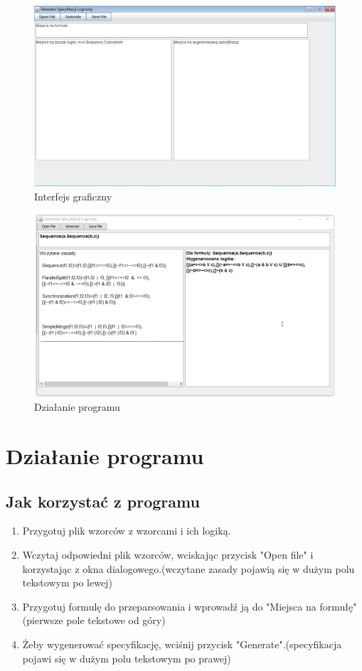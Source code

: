 \documentclass[a4paper, 11pt]{article}
\begin{document}
	\begin{figure}[H]
	\centerline{\includegraphics[scale=0.7]{GUI}}
	\caption{Interfejs graficzny}
	\end{figure}%
	
	\begin{figure}[H]
	\centerline{\includegraphics[scale=0.7]{program}}
	\caption{Działanie programu}
	\end{figure}%
	
	
	
	\section{Działanie programu}
	\subsection{Jak korzystać z programu}
	\begin{enumerate}
	\item Przygotuj plik wzorców z wzorcami i ich logiką.
	\item Wczytaj odpowiedni plik wzorców, wciskając przycisk "Open file" i korzystając z okna dialogowego.(wczytane zasady pojawią się w dużym polu tekstowym po lewej)
	\item Przygotuj formulę do przeparsowania i wprowadź ją do "Miejsca na formułę"(pierwsze pole tekstowe od góry)
	\item Żeby wygenerować specyfikację, wciśnij przycisk "Generate".(specyfikacja pojawi się w dużym polu tekstowym po prawej)
	\end{enumerate}
	
\end{document}
